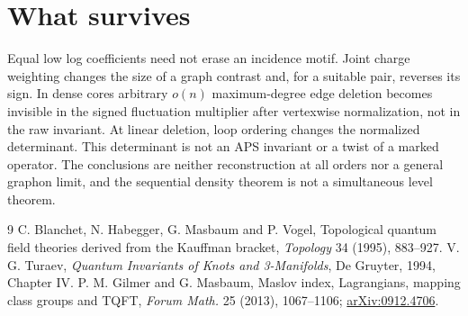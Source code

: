 \documentclass[11pt]{article}
\theoremstyle{definition}
\begin{document}


\section{What survives}
Equal low log coefficients need not erase an incidence motif. Joint charge weighting changes the size of a graph contrast and, for a suitable pair, reverses its sign. In dense cores arbitrary \(o(n)\) maximum-degree edge deletion becomes invisible in the signed fluctuation multiplier after vertexwise normalization, not in the raw invariant. At linear deletion, loop ordering changes the normalized determinant. This determinant is not an APS invariant or a twist of a marked operator. The conclusions are neither reconstruction at all orders nor a general graphon limit, and the sequential density theorem is not a simultaneous level theorem.

\begin{thebibliography}{9}
 C. Blanchet, N. Habegger, G. Masbaum and P. Vogel, Topological quantum field theories derived from the Kauffman bracket, \emph{Topology} 34 (1995), 883--927.
 V. G. Turaev, \emph{Quantum Invariants of Knots and 3-Manifolds}, De Gruyter, 1994, Chapter IV.
 P. M. Gilmer and G. Masbaum, Maslov index, Lagrangians, mapping class groups and TQFT, \emph{Forum Math.} 25 (2013), 1067--1106; \href{https://arxiv.org/abs/0912.4706}{arXiv:0912.4706}.
\end{thebibliography}
\end{document}
